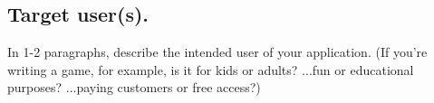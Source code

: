 \documentclass[12pt]{article}
\begin{document}
\underline{\phantom{\hspace{5in}}}

\underline{\phantom{\hspace{5in}}}

\underline{\phantom{\hspace{5in}}}

\underline{\phantom{\hspace{5in}}}

\underline{\phantom{\hspace{5in}}}

\underline{\phantom{\hspace{5in}}}

\underline{\phantom{\hspace{5in}}}

\underline{\phantom{\hspace{5in}}}

\underline{\phantom{\hspace{5in}}}

\underline{\phantom{\hspace{5in}}}

\underline{\phantom{\hspace{5in}}}

\underline{\phantom{\hspace{5in}}}

\underline{\phantom{\hspace{5in}}}

\underline{\phantom{\hspace{5in}}}

\underline{\phantom{\hspace{5in}}}

\underline{\phantom{\hspace{5in}}}

\underline{\phantom{\hspace{5in}}}

\underline{\phantom{\hspace{5in}}}

\underline{\phantom{\hspace{5in}}}

\underline{\phantom{\hspace{5in}}}

\underline{\phantom{\hspace{5in}}}

\underline{\phantom{\hspace{5in}}}

\subsection{Target user(s).}
In 1-2 paragraphs, describe the intended user of your application. (If you're writing a game, for example, is it for kids or adults? ...fun or educational purposes? ...paying customers or free access?)
\end{document}
